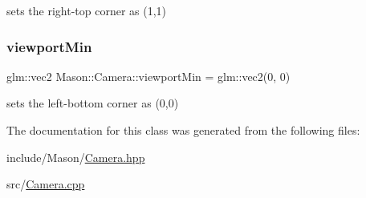 sets the right-\/top corner as (1,1) 

\hypertarget{class_mason_1_1_camera_a87d7d4111e63ecb41bac7ea33ef270e1}{}\label{class_mason_1_1_camera_a87d7d4111e63ecb41bac7ea33ef270e1} 
\subsubsection{\texorpdfstring{viewport\+Min}{viewportMin}}
{\footnotesize\ttfamily glm\+::vec2 Mason\+::\+Camera\+::viewport\+Min = glm\+::vec2(0, 0)\hspace{0.3cm}{\ttfamily [protected]}}



sets the left-\/bottom corner as (0,0) 



The documentation for this class was generated from the following files\+:\begin{DoxyCompactItemize}
\item 
include/\+Mason/\hyperlink{_camera_8hpp}{Camera.\+hpp}\item 
src/\hyperlink{_camera_8cpp}{Camera.\+cpp}\end{DoxyCompactItemize}
